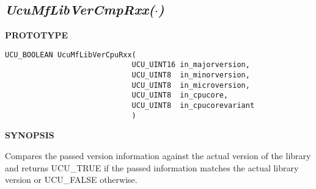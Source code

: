 \subsection[\emph{UcuMfLibVerCmpRxx(\protect\mbox{\protect$\cdot$})}]
           {\emph{UcuMfLibVerCmpRxx(\protect\mbox{\protect\boldmath $\cdot$})}}
\label{cmsc0:slcp0}

%

\noindent\textbf{PROTOTYPE}
\begin {list}{}{\setlength{\leftmargin}{0.25in}\setlength{\topsep}{0.0in}}
\item
\begin{verbatim}
UCU_BOOLEAN UcuMfLibVerCpuRxx(
                             UCU_UINT16 in_majorversion,
                             UCU_UINT8  in_minorversion,
                             UCU_UINT8  in_microversion,
                             UCU_UINT8  in_cpucore,
                             UCU_UINT8  in_cpucorevariant
                             )
\end{verbatim}
\end{list}
\vspace{2.8ex}

\noindent\textbf{SYNOPSIS}
\begin{list}{}{\setlength{\leftmargin}{0.25in}\setlength{\topsep}{0.0in}}
\item
Compares the passed version information against the actual version
of the library and returns UCU\_TRUE if the passed information matches
the actual library version or UCU\_FALSE otherwise.
\end{list}
\vspace{2.8ex}


